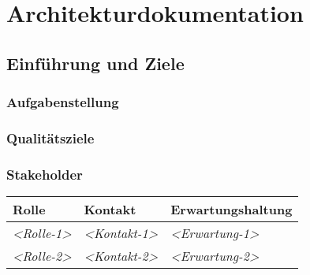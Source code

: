 \section{Architekturdokumentation}

\subsection{Einführung und Ziele}\label{section-introduction-and-goals}

\subsubsection{Aufgabenstellung}\label{_aufgabenstellung}

\subsubsection{Qualitätsziele}\label{_qualit_tsziele}

\subsubsection{Stakeholder}\label{_stakeholder}

\begin{longtable}[]{@{}lll@{}}
\toprule
\begin{minipage}[b]{0.23\columnwidth}\raggedright\strut
Rolle\strut
\end{minipage} & \begin{minipage}[b]{0.23\columnwidth}\raggedright\strut
Kontakt\strut
\end{minipage} & \begin{minipage}[b]{0.46\columnwidth}\raggedright\strut
Erwartungshaltung\strut
\end{minipage}\tabularnewline
\midrule
\endhead
\begin{minipage}[t]{0.23\columnwidth}\raggedright\strut
\emph{\textless{}Rolle-1\textgreater{}}\strut
\end{minipage} & \begin{minipage}[t]{0.23\columnwidth}\raggedright\strut
\emph{\textless{}Kontakt-1\textgreater{}}\strut
\end{minipage} & \begin{minipage}[t]{0.46\columnwidth}\raggedright\strut
\emph{\textless{}Erwartung-1\textgreater{}}\strut
\end{minipage}\tabularnewline
\begin{minipage}[t]{0.23\columnwidth}\raggedright\strut
\emph{\textless{}Rolle-2\textgreater{}}\strut
\end{minipage} & \begin{minipage}[t]{0.23\columnwidth}\raggedright\strut
\emph{\textless{}Kontakt-2\textgreater{}}\strut
\end{minipage} & \begin{minipage}[t]{0.46\columnwidth}\raggedright\strut
\emph{\textless{}Erwartung-2\textgreater{}}\strut
\end{minipage}\tabularnewline
\bottomrule
\end{longtable}

